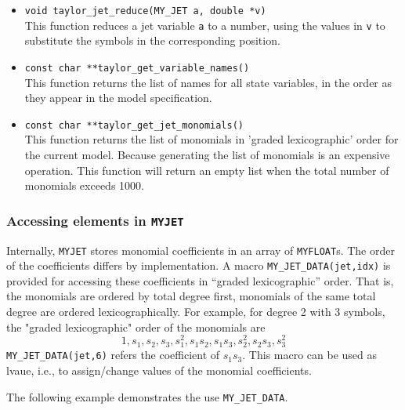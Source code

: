 \documentclass[10pt]{article}
\theoremstyle{remark}
\newcommand{\myfloat}{{\tt MY\symbol{95}FLOAT}}
\newcommand{\myjet}{{\tt MY\symbol{95}JET}}
\newcommand{\inputfiles}[1]{%
\ifthenelse{\equal{#1}{sec:ex0}}{{\tt lorenz1.eq}}{%
\ifthenelse{\equal{#1}{sec:ex1}}{{\tt lorenz1.eq}}{%
\ifthenelse{\equal{#1}{sec:ex_params}}{{\tt perturbation.eq}}{%
\ifthenelse{\equal{#1}{sec:ex_lyap}}{{\tt lorenz2.eq}}{%
\ifthenelse{\equal{#1}{sec:ex_varieq}}{{\tt lorenz3.eq}}{%
\ifthenelse{\equal{#1}{sec:ex5}}{{\tt lorenz4.eq}}{%
\ifthenelse{\equal{#1}{sec:ex_omp}}{{\tt lorenz4.eq}}{%
\ifthenelse{\equal{#1}{sec:ex_equilibria}}{{\tt lorenz5.eq}}{%
\ifthenelse{\equal{#1}{sec:ex_myjetaccess}}{{\tt model.eq}}{%
\ifthenelse{\equal{#1}{sec:ex_driving}}{{\tt lorenz1.eq}}{%
ERROR!!!!!}}}}}}}}}}%
}
\newcommand{\odecfiles}[1]{%
\ifthenelse{\equal{#1}{sec:ex0}}{{\tt lorenz1.c}}{%
\ifthenelse{\equal{#1}{sec:ex1}}{{\tt lorenz1.c}}{%
\ifthenelse{\equal{#1}{sec:ex_params}}{{\tt perturbation.c}}{%
\ifthenelse{\equal{#1}{sec:ex_lyap}}{{\tt lorenz2.c}}{%
\ifthenelse{\equal{#1}{sec:ex_varieq}}{{\tt lorenz3.c}}{%
\ifthenelse{\equal{#1}{sec:ex5}}{{\tt lorenz4.c}}{%
\ifthenelse{\equal{#1}{sec:ex_omp}}{{\tt lorenz4.c}}{%
\ifthenelse{\equal{#1}{sec:ex_equilibria}}{{\tt lorenz5.c}}{%
\ifthenelse{\equal{#1}{sec:ex_myjetaccess}}{{\tt jdata.c}}{%
\ifthenelse{\equal{#1}{sec:ex_driving}}{{\tt lorenz.c}}{%
ERROR!!!!!}}}}}}}}}}%
}
\newcommand{\odehfiles}[1]{%
\ifthenelse{\equal{#1}{sec:ex0}}{{\tt taylor.h}}{%
\ifthenelse{\equal{#1}{sec:ex1}}{{\tt taylor.h}}{%
\ifthenelse{\equal{#1}{sec:ex_params}}{{\tt taylor.h}}{%
\ifthenelse{\equal{#1}{sec:ex_lyap}}{{\tt lorenz2.h}}{%
\ifthenelse{\equal{#1}{sec:ex_varieq}}{{\tt lorenz3.h}}{%
\ifthenelse{\equal{#1}{sec:ex5}}{{\tt lorenz4.h}}{%
\ifthenelse{\equal{#1}{sec:ex_omp}}{{\tt lorenz4.h}}{%
\ifthenelse{\equal{#1}{sec:ex_equilibria}}{{\tt lorenz5.h}}{%
\ifthenelse{\equal{#1}{sec:ex_myjetaccess}}{{\tt jdata.h}}{%
\ifthenelse{\equal{#1}{sec:ex_driving}}{{\tt taylor.h}}{%
ERROR!!!!!}}}}}}}}}}%
}
\newcommand{\mainfiles}[1]{%
\ifthenelse{\equal{#1}{sec:ex0}}{{\tt main\symbol{95}lrnz.c}}{%
\ifthenelse{\equal{#1}{sec:ex1}}{{\tt main\symbol{95}lrnz.c}}{%
\ifthenelse{\equal{#1}{sec:ex_params}}{{\tt main\symbol{95}params.c}}{%
\ifthenelse{\equal{#1}{sec:ex_lyap}}{{\tt main\symbol{95}lyap.c}}{%
\ifthenelse{\equal{#1}{sec:ex_varieq}}{{\tt main\symbol{95}varieq.c}}{%
\ifthenelse{\equal{#1}{sec:ex5}}{{\tt main4.c}}{%
\ifthenelse{\equal{#1}{sec:ex_omp}}{{\tt main\symbol{95}omp.c}}{%
\ifthenelse{\equal{#1}{sec:ex_equilibria}}{{\tt main\symbol{95}equilibria.c}}{%
\ifthenelse{\equal{#1}{sec:ex_myjetaccess}}{{\tt jdata\symbol{95}main.c}}{%
ERROR!!!!!}}}}}}}}}%
}
\newcommand{\inputfile}{}
\newcommand{\mainfile}{}
\newcommand{\odecfile}{}
\newcommand{\odehfile}{}
\begin{document}
\begin{itemize}
\item{\verb+void taylor_jet_reduce(MY_JET a, double *v)+\\
    This function reduces a jet variable \verb+a+ to a number, using
    the values in \verb+v+ to substitute the symbols in the
    corresponding position.}
    
\item{\verb+const char **taylor_get_variable_names()+\\
    This function returns the list of names for all state variables,
    in the order as they appear in the model specification.}
    
\item{\verb+const char **taylor_get_jet_monomials()+\\
    This function returns the list of monomials in 'graded
    lexicographic' order for the current model. Because generating the
    list of monomials is an expensive operation. This function will
    return an empty list when the total number of monomials exceeds
    1000.}
\end{itemize}


\subsubsection*{Accessing elements in \myjet{}} \label{sec:ex_myjetaccess}
\renewcommand{\inputfile}{\inputfiles{sec:ex_myjetaccess}}
\renewcommand{\odecfile}{\odecfiles{sec:ex_myjetaccess}}
\renewcommand{\odehfile}{\odehfiles{sec:ex_myjetaccess}}
\renewcommand{\mainfile}{\mainfiles{sec:ex_myjetaccess}}

Internally, \myjet{} stores monomial coefficients in an array of
\myfloat{}s. The order of the coefficients differs by
implementation. A macro \verb+MY_JET_DATA(jet,idx)+ is provided for
accessing these coefficients in ``graded lexicographic'' order.  That
is, the monomials are ordered by total degree first, monomials of the
same total degree are ordered lexicographically.  For example, for
degree 2 with 3 symbols, the "graded lexicographic" order of the
monomials are
\[
1, s_1, s_2, s_3, s_1^2, s_1s_2, s_1s_3, s_2^2, s_2s_3, s_3^2
\]
\verb+MY_JET_DATA(jet,6)+ refers the coefficient of $s_1s_3$.  This
macro can be used as lvaue, i.e., to assign/change values of the
monomial coefficients.

\vspace{4mm}

The following example demonstrates the use \verb+MY_JET_DATA+.
\end{document}

